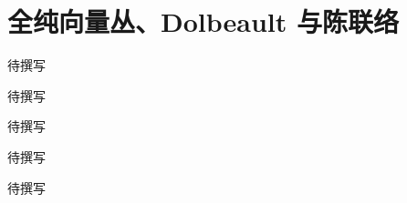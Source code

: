 
% 
% 

\chapter{全纯向量丛、Dolbeault 与陈联络}
\label{g4:ch:16}

\begin{chapterabstract}
待撰写
\end{chapterabstract}

\begin{learninggoals}
待撰写
\end{learninggoals}

待撰写






\begin{chaptersummary}
待撰写
\end{chaptersummary}

\BookExercises
待撰写

